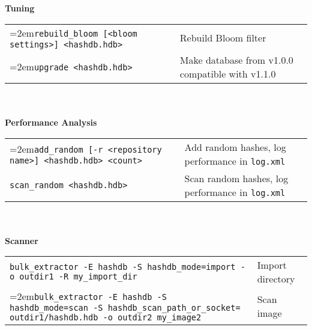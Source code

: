 \begin{small}
\begin{footnotesize}
\begin{tabular}{p{3.6 in} p{3.0 in}}
\end{tabular}
\\
\\
\textbf{Tuning}\\
\begin{tabular}{p{3.6 in} p{3.0 in}}
\hangindent=2em\texttt{rebuild\_bloom [<bloom settings>] <hashdb.hdb>} & Rebuild Bloom filter \\
\hangindent=2em\texttt{upgrade <hashdb.hdb>} & Make database from v1.0.0 compatible with v1.1.0\\
\end{tabular}
\\
\\
\textbf{Performance Analysis}\\
\begin{tabular}{p{3.6 in} p{4 in}}
\hangindent=2em\texttt{add\_random [-r <repository name>] <hashdb.hdb> <count>} & Add random hashes, log performance in \texttt{log.xml}\\
\texttt{scan\_random <hashdb.hdb>} & Scan random hashes, log performance in \texttt{log.xml}\\
\end{tabular}
\\
\\
\textbf{\bulk Scanner}\\
\begin{tabular}{p{5.6 in} p{2 in}}
\texttt{bulk\_extractor -E hashdb -S hashdb\_mode=import -o outdir1 -R my\_import\_dir} & Import directory\\
\hangindent=2em\texttt{bulk\_extractor -E hashdb -S hashdb\_mode=scan -S hashdb\_scan\_path\_or\_socket= outdir1/hashdb.hdb -o outdir2 my\_image2} & Scan image\\
\end{tabular}
\end{footnotesize}
\end{small}

